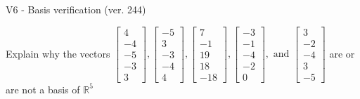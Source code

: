 \begin{exercise}
  \begin{exerciseTitle}V6 - Basis verification (ver. 244)\end{exerciseTitle}
  \begin{exerciseStatement}
    Explain why the vectors \(\left[\begin{array}{r}
4 \\
-4 \\
-5 \\
-3 \\
3
\end{array}\right] , \left[\begin{array}{r}
-5 \\
3 \\
-3 \\
-4 \\
4
\end{array}\right] , \left[\begin{array}{r}
7 \\
-1 \\
19 \\
18 \\
-18
\end{array}\right] , \left[\begin{array}{r}
-3 \\
-1 \\
-4 \\
-2 \\
0
\end{array}\right] , \text{ and } \left[\begin{array}{r}
3 \\
-2 \\
-4 \\
3 \\
-5
\end{array}\right]\) are or are not a basis of \(\mathbb{R}^5\)	



\end{exerciseStatement}
\end{exercise}
